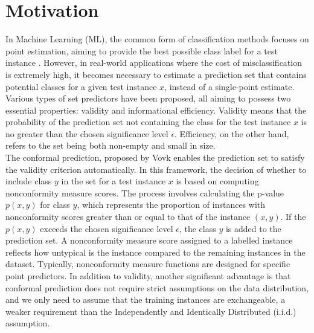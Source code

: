 \documentclass[10pt]{reportMaster}
\begin{document}
\section{Motivation}
In Machine Learning (ML), the common form of classification methods focuses on point estimation, aiming to provide the best possible class label for a test instance \cite{johansson2013evolved, vanderlooy2006analysis}. However, in real-world applications where the cost of misclassification is extremely high, it becomes necessary to estimate a prediction set that contains potential classes for a given test instance $x$, instead of a single-point estimate. Various types of set predictors have been proposed, all aiming to possess two essential properties: validity and informational efficiency. Validity means that the probability of the prediction set not containing the class for the test instance $x$ is no greater than the chosen significance level $\epsilon$. Efficiency, on the other hand, refers to the set being both non-empty and small in size.\\

\noindent The conformal prediction, proposed by Vovk \cite{vovk2005algorithmic} enables the prediction set to satisfy the validity criterion automatically. In this framework, the decision of whether to include class $y$ in the set for a test instance $x$ is based on computing nonconformity measure scores. The process involves calculating the p-value $p(x,y)$ for class $y$, which represents the proportion of instances with nonconformity scores greater than or equal to that of the instance $(x, y)$. If the $p(x,y)$ exceeds the chosen significance level $\epsilon$, the class $y$ is added to the prediction set. A nonconformity measure score assigned to a labelled instance reflects how untypical is the instance compared to the remaining instances in the dataset. Typically, nonconformity measure functions are designed for specific point predictors. In addition to validity, another significant advantage is that conformal prediction does not require strict assumptions on the data distribution, and we only need to assume that the training instances are exchangeable, a weaker requirement than the Independently and Identically Distributed (i.i.d.) assumption. \\
\end{document}
